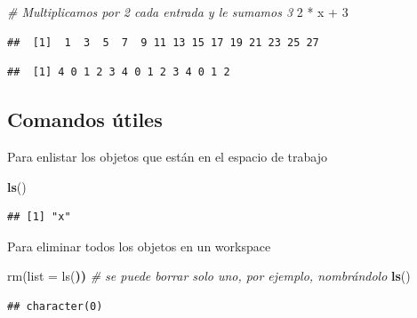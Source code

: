 \documentclass[]{article}
\newenvironment{Shaded}{\begin{snugshade}}{\end{snugshade}}
\newcommand{\KeywordTok}[1]{\textcolor[rgb]{0.13,0.29,0.53}{\textbf{{#1}}}}
\newcommand{\DecValTok}[1]{\textcolor[rgb]{0.00,0.00,0.81}{{#1}}}
\newcommand{\StringTok}[1]{\textcolor[rgb]{0.31,0.60,0.02}{{#1}}}
\newcommand{\CommentTok}[1]{\textcolor[rgb]{0.56,0.35,0.01}{\textit{{#1}}}}
\newcommand{\ErrorTok}[1]{\textbf{{#1}}}
\newcommand{\NormalTok}[1]{{#1}}
\begin{document}
\begin{Shaded}
\begin{Highlighting}[]
\CommentTok{# Multiplicamos por 2 cada entrada y le sumamos 3}
\DecValTok{2} \NormalTok{*}\StringTok{ }\NormalTok{x +}\StringTok{ }\DecValTok{3}
\end{Highlighting}
\end{Shaded}

\begin{verbatim}
##  [1]  1  3  5  7  9 11 13 15 17 19 21 23 25 27
\end{verbatim}

\begin{Shaded}
\end{Shaded}

\begin{verbatim}
##  [1] 4 0 1 2 3 4 0 1 2 3 4 0 1 2
\end{verbatim}

\subsection{Comandos útiles}\label{comandos-utiles}

Para enlistar los objetos que están en el espacio de trabajo

\begin{Shaded}
\begin{Highlighting}[]
\KeywordTok{ls}\NormalTok{()}
\end{Highlighting}
\end{Shaded}

\begin{verbatim}
## [1] "x"
\end{verbatim}

Para eliminar todos los objetos en un workspace

\begin{Shaded}
\begin{Highlighting}[]
\NormalTok{rm(list = ls(}\ErrorTok{))} \CommentTok{# se puede borrar solo uno, por ejemplo, nombrándolo}
\KeywordTok{ls}\NormalTok{()}
\end{Highlighting}
\end{Shaded}

\begin{verbatim}
## character(0)
\end{verbatim}
\end{document}
